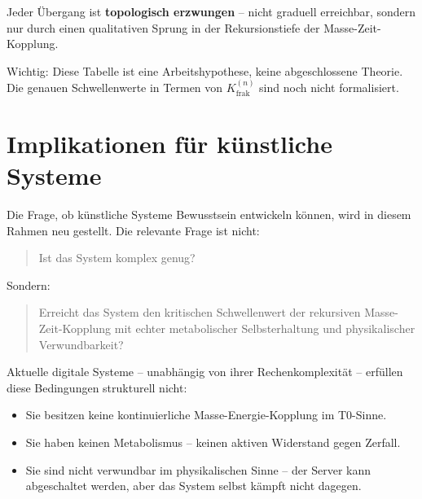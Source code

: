 	\begin{table}[h]
		\centering
		\caption{Hierarchie diskreter Komplexitätsschwellen}
	\end{table}
	
	Jeder Übergang ist \textbf{topologisch erzwungen} -- nicht graduell erreichbar, sondern nur durch einen qualitativen Sprung in der Rekursionstiefe der Masse-Zeit-Kopplung.
	
	Wichtig: Diese Tabelle ist eine Arbeitshypothese, keine abgeschlossene Theorie. Die genauen Schwellenwerte in Termen von $K_{\text{frak}}^{(n)}$ sind noch nicht formalisiert.
	
	\section{Implikationen für künstliche Systeme}
	
	Die Frage, ob künstliche Systeme Bewusstsein entwickeln können, wird in diesem Rahmen neu gestellt. Die relevante Frage ist nicht:
	\begin{quote}
		Ist das System komplex genug?
	\end{quote}
	Sondern:
	\begin{quote}
		Erreicht das System den kritischen Schwellenwert der rekursiven Masse-Zeit-Kopplung mit echter metabolischer Selbsterhaltung und physikalischer Verwundbarkeit?
	\end{quote}
	
	Aktuelle digitale Systeme -- unabhängig von ihrer Rechenkomplexität -- erfüllen diese Bedingungen strukturell nicht:
	\begin{itemize}
		\item Sie besitzen keine kontinuierliche Masse-Energie-Kopplung im T0-Sinne.
		\item Sie haben keinen Metabolismus -- keinen aktiven Widerstand gegen Zerfall.
		\item Sie sind nicht verwundbar im physikalischen Sinne -- der Server kann abgeschaltet werden, aber das System selbst kämpft nicht dagegen.
	\end{itemize}
	
